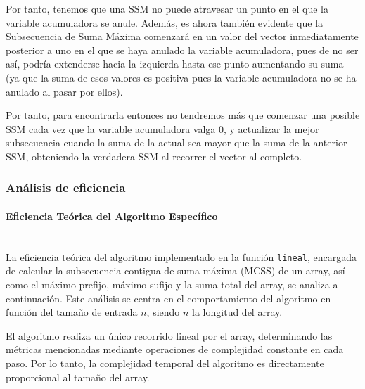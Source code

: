 \documentclass{article}
\newcommand{\myparagraph}[1]{\paragraph{#1}\mbox{}\\}
\begin{document}
\begin{teo}
\end{teo}
Por tanto, tenemos que una SSM no puede atravesar un punto en el que la variable acumuladora se anule.
Además, es ahora también evidente que la Subsecuencia de Suma Máxima comenzará en
un valor del vector inmediatamente posterior a uno en el que 
se haya anulado la variable acumuladora, pues de no ser así, podría extenderse hacia la izquierda hasta ese punto aumentando su suma (ya que la suma de esos valores es positiva pues la variable acumuladora no se ha anulado al pasar por ellos). 

Por tanto, para encontrarla entonces no tendremos más que comenzar una posible SSM cada vez que la variable acumuladora valga 0, y actualizar la mejor subsecuencia cuando la suma de la actual sea mayor que la suma de la anterior SSM, obteniendo la verdadera SSM al recorrer el vector al completo.

\subsubsection{Análisis de eficiencia} %
\myparagraph{Eficiencia Teórica del Algoritmo Específico}

La eficiencia teórica del algoritmo implementado en la función \texttt{lineal}, encargada de calcular la subsecuencia contigua de suma máxima (MCSS) de un array, así como el máximo prefijo, máximo sufijo y la suma total del array, se analiza a continuación. Este análisis se centra en el comportamiento del algoritmo en función del tamaño de entrada $n$, siendo $n$ la longitud del array.


El algoritmo realiza un único recorrido lineal por el array, determinando las métricas mencionadas mediante operaciones de complejidad constante en cada paso. Por lo tanto, la complejidad temporal del algoritmo es directamente proporcional al tamaño del array.
\end{document}
